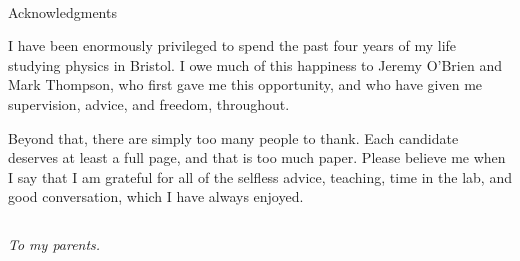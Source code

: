 \newpage
~\\
\vspace{50pt}
\begin{center}
{\Large \sc Acknowledgments \\ \rm}
\vspace{25pt}
\end{center}

I have been enormously privileged to spend the past four years of my life studying physics in Bristol. I owe much of this happiness to Jeremy O'Brien and Mark Thompson, who first gave me this opportunity, and who have given me supervision, advice, and freedom, throughout. 

Beyond that, there are simply too many people to thank. Each candidate deserves at least a full page, and that is too much paper. Please believe me when I say that I am grateful for all of the selfless advice, teaching, time in the lab, and good conversation, which I have always enjoyed.

















\clearpage


$~$
\vspace{90pt}
\begin{center}
\textit{To my parents.}
\end{center}


